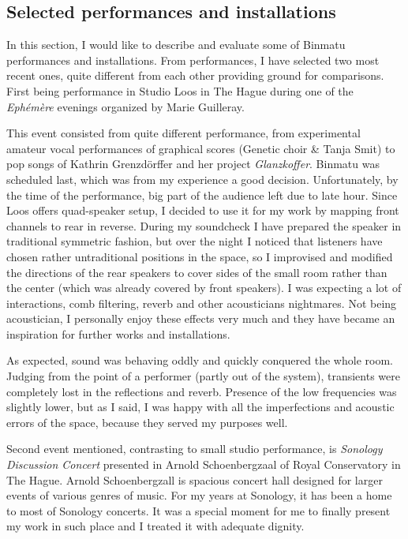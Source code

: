\documentclass[11pt,a4paper,oneside]{report}
\begin{document}
\subsection{Selected performances and installations} In this section, I would like to describe and evaluate some of Binmatu performances and installations. From performances, I have selected two most recent ones, quite different from each other providing ground for comparisons. First being performance in Studio Loos in The Hague during one of the \emph{Ephémère} evenings organized by Marie Guilleray. 

This event consisted from quite different performance, from experimental amateur vocal performances of graphical scores (Genetic choir \& Tanja Smit) to pop songs of Kathrin Grenzdörffer and her project \emph{Glanzkoffer}. Binmatu was scheduled last, which was from my experience a good decision. Unfortunately, by the time of the performance, big part of the audience left due to late hour. Since Loos offers quad-speaker setup, I decided to use it for my work by mapping front channels to rear in reverse. During my soundcheck I have prepared the speaker in traditional symmetric fashion, but over the night I noticed that listeners have chosen rather untraditional positions in the space, so I improvised and modified the directions of the rear speakers to cover sides of the small room rather than the center (which was already covered by front speakers). I was expecting a lot of interactions, comb filtering, reverb and other acousticians nightmares. Not being acoustician, I personally enjoy these effects very much and they have became an inspiration for further works and installations. 

As expected, sound was behaving oddly and quickly conquered the whole room. Judging from the point of a performer (partly out of the system), transients were completely lost in the reflections and reverb. Presence of the low frequencies was slightly lower, but as I said, I was happy with all the imperfections and acoustic errors of the space, because they served my purposes well.

Second event mentioned, contrasting to small studio performance, is \emph{Sonology Discussion Concert} presented in Arnold Schoenbergzaal of Royal Conservatory in The Hague. Arnold Schoenbergzall is spacious concert hall designed for larger events of various genres of music. For my years at Sonology, it has been a home to most of Sonology concerts. It was a special moment for me to finally present my work in such place and I treated it with adequate dignity.
\end{document}
